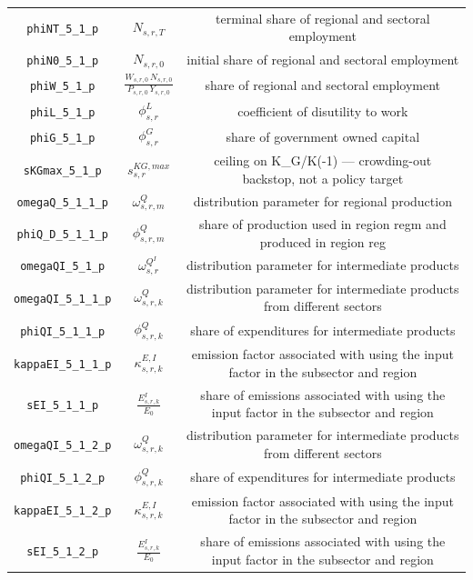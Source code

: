 \begin{center}
\begin{longtable}{ccc}
\texttt{phiNT\_5\_1\_p} & ${N_{s,r,T}}$ & terminal share of regional and sectoral employment\\
\texttt{phiN0\_5\_1\_p} & ${N_{s,r,0}}$ & initial share of regional and sectoral employment\\
\texttt{phiW\_5\_1\_p} & $\frac{W_{s,r,0} \, N_{s,r,0}}{P_{s,r,0} \, Y_{s,r,0}}$ & share of regional and sectoral employment\\
\texttt{phiL\_5\_1\_p} & ${\phi^{L}_{s,r}}$ & coefficient of disutility to work\\
\texttt{phiG\_5\_1\_p} & ${\phi^{G}_{s,r}}$ & share of government owned capital\\
\texttt{sKGmax\_5\_1\_p} & ${s^{KG,max}_{s,r}}$ & ceiling on K\_G/K(-1) — crowding-out backstop, not a policy target\\
\texttt{omegaQ\_5\_1\_1\_p} & ${\omega^{Q}_{s,r,m}}$ & distribution parameter for regional production\\
\texttt{phiQ\_D\_5\_1\_1\_p} & ${\phi^{Q}_{s,r,m}}$ & share of production used in region regm and produced in region reg\\
\texttt{omegaQI\_5\_1\_p} & ${\omega^{Q^{I}}_{s,r}}$ & distribution parameter for intermediate products\\
\texttt{omegaQI\_5\_1\_1\_p} & ${\omega^{Q}_{s,r,k}}$ & distribution parameter for intermediate products from different sectors\\
\texttt{phiQI\_5\_1\_1\_p} & ${\phi^{Q}_{s,r,k}}$ & share of expenditures for intermediate products\\
\texttt{kappaEI\_5\_1\_1\_p} & ${\kappa^{E,I}_{s,r,k}}$ & emission factor associated with using the input factor in the subsector and region\\
\texttt{sEI\_5\_1\_1\_p} & ${\frac{E^{I}_{s,r,k}}{E_0}}$ & share of emissions associated with using the input factor in the subsector and region\\
\texttt{omegaQI\_5\_1\_2\_p} & ${\omega^{Q}_{s,r,k}}$ & distribution parameter for intermediate products from different sectors\\
\texttt{phiQI\_5\_1\_2\_p} & ${\phi^{Q}_{s,r,k}}$ & share of expenditures for intermediate products\\
\texttt{kappaEI\_5\_1\_2\_p} & ${\kappa^{E,I}_{s,r,k}}$ & emission factor associated with using the input factor in the subsector and region\\
\texttt{sEI\_5\_1\_2\_p} & ${\frac{E^{I}_{s,r,k}}{E_0}}$ & share of emissions associated with using the input factor in the subsector and region\\

\end{longtable}
\end{center}
